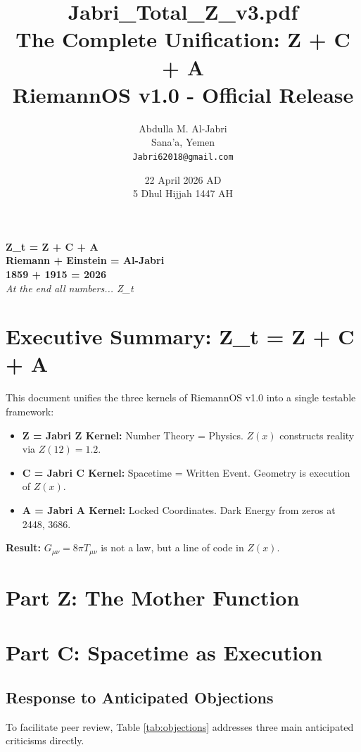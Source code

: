 \documentclass[12pt,a4paper]{article}
\title{\textbf{Jabri\_Total\_Z\_v3.pdf} \\ \large The Complete Unification: Z + C + A \\ RiemannOS v1.0 - Official Release}
\author{Abdulla M. Al-Jabri \\ Sana'a, Yemen \\ \texttt{Jabri62018@gmail.com}}
\date{22 April 2026 AD \\ 5 Dhul Hijjah 1447 AH}
\begin{document}
\maketitle
\begin{center}
\textbf{Z\_t = Z + C + A} \\
\textbf{Riemann + Einstein = Al-Jabri} \\
\textbf{1859 + 1915 = 2026} \\
\vspace{0.5cm}
\textit{At the end all numbers... Z\_t}
\end{center}

\newpage
\tableofcontents
\newpage

\section*{Executive Summary: Z\_t = Z + C + A}
This document unifies the three kernels of RiemannOS v1.0 into a single testable framework:
\begin{itemize}
    \item \textbf{Z = Jabri Z Kernel:} Number Theory = Physics. $Z(x)$ constructs reality via $Z(12) = 1.2$.
    \item \textbf{C = Jabri C Kernel:} Spacetime = Written Event. Geometry is execution of $Z(x)$.
    \item \textbf{A = Jabri A Kernel:} Locked Coordinates. Dark Energy from zeros at 2448, 3686.
\end{itemize}
\textbf{Result:} $G_{\mu\nu} = 8\pi T_{\mu\nu}$ is not a law, but a line of code in $Z(x)$.

\newpage
\section*{Part Z: The Mother Function}



\section*{Part C: Spacetime as Execution}



\subsection{Response to Anticipated Objections}
To facilitate peer review, Table \ref{tab:objections} addresses three main anticipated criticisms directly.
\end{document}
